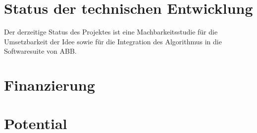 
\section{Status der technischen Entwicklung}

Der derzeitige Status des Projektes ist eine Machbarkeitsstudie für die Umsetzbarkeit der Idee sowie für die Integration des Algorithmus in die Softwaresuite von ABB.

\section{Finanzierung}



\section{Potential}



\blindtext
\newpage
\blindtextkl